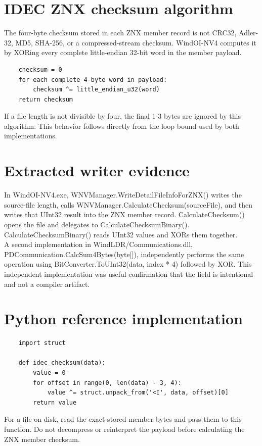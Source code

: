 \documentclass[]{article}
\begin{document}
\section{IDEC ZNX checksum algorithm}
The four-byte checksum stored in each ZNX member record is not CRC32, Adler-32, MD5, SHA-256, or a compressed-stream checksum. WindOI-NV4 computes it by XORing every complete little-endian 32-bit word in the member payload.

\begin{verbatim}
	checksum = 0
	for each complete 4-byte word in payload:
	    checksum ^= little_endian_u32(word)
	return checksum
\end{verbatim}
If a file length is not divisible by four, the final 1-3 bytes are ignored by this algorithm. This behavior follows directly from the loop bound used by both implementations.

\section{Extracted writer evidence}
In WindOI-NV4.exe, WNVManager.WriteDetailFileInfoForZNX() writes the source-file length, calls WNVManager.CalculateChecksum(sourceFile), and then writes that UInt32 result into the ZNX member record. CalculateChecksum() opens the file and delegates to CalculateChecksumBinary(). CalculateChecksumBinary() reads UInt32 values and XORs them together.\\

A second implementation in WindLDR/Communications.dll, PDCommunication.CalcSum4Bytes(byte[]), independently performs the same operation using BitConverter.ToUInt32(data, index * 4) followed by XOR. This independent implementation was useful confirmation that the field is intentional and not a compiler artifact.

\section{Python reference implementation}
\begin{verbatim}
	import struct
	
	def idec_checksum(data):
	    value = 0
	    for offset in range(0, len(data) - 3, 4):
	        value ^= struct.unpack_from('<I', data, offset)[0]
	    return value
\end{verbatim}
For a file on disk, read the exact stored member bytes and pass them to this function. Do not decompress or reinterpret the payload before calculating the ZNX member checksum.
\end{document}
